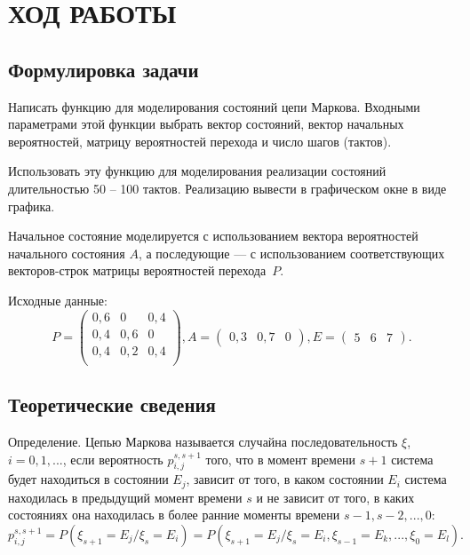 \section{ХОД РАБОТЫ}

\subsection{Формулировка задачи}

Написать функцию для моделирования состояний цепи Маркова.
Входными параметрами этой функции выбрать вектор состояний,
вектор начальных вероятностей, матрицу вероятностей перехода и
число шагов (тактов).

Использовать эту функцию для моделирования реализации состояний длительностью
50 -- 100 тактов.
Реализацию вывести в графическом окне в виде графика.

Начальное состояние моделируется с использованием вектора
вероятностей начального состояния $ A $, а последующие --- с использованием
соответствующих векторов-строк матрицы вероятностей перехода~$ P $.

Исходные данные:
\begin{equation*}
P = \begin{pmatrix}
      0{,}6 & 0 & 0{,}4 \\
      0{,}4 & 0{,}6 & 0 \\
      0{,}4 & 0{,}2 & 0{,}4 \\
    \end{pmatrix},
A = \begin{pmatrix}
      0{,}3 & 0{,}7 & 0
    \end{pmatrix},
E = \begin{pmatrix}
      5 & 6 & 7
    \end{pmatrix}.
\end{equation*}


\subsection{Теоретические сведения}

Определение. Цепью Маркова называется случайна последовательность
$\xi$, $ i = 0,1, ... $, если вероятность $ p_{i,j}^{s, s+1} $ того,
что в момент времени $ s+1 $ система будет находиться в состоянии $ E_j $,
зависит от того, в каком состоянии $ E_i $ система находилась в предыдущий момент
времени $ s $ и не зависит от того, в каких состояниях она находилась в более
ранние моменты времени $ s-1, s-2, ..., 0 $:
\begin{equation*}
  p_{i,j}^{s,s+1} = P(\xi_{s+1} = E_j / \xi_s = E_i) = P(\xi_{s+1} = E_j / \xi_s = E_i, \xi_{s-1} = E_k,...,\xi_0 = E_l).
\end{equation*}

